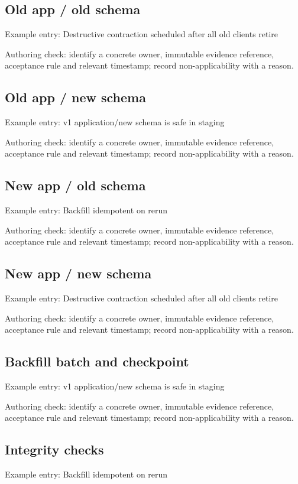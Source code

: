 \documentclass[10pt,letterpaper]{article}
\begin{document}
\subsection{Old app / old schema}
Example entry: Destructive contraction scheduled after all old clients retire

Authoring check: identify a concrete owner, immutable evidence reference, acceptance rule and relevant timestamp; record non-applicability with a reason.


\subsection{Old app / new schema}
Example entry: v1 application/new schema is safe in staging

Authoring check: identify a concrete owner, immutable evidence reference, acceptance rule and relevant timestamp; record non-applicability with a reason.


\subsection{New app / old schema}
Example entry: Backfill idempotent on rerun

Authoring check: identify a concrete owner, immutable evidence reference, acceptance rule and relevant timestamp; record non-applicability with a reason.


\subsection{New app / new schema}
Example entry: Destructive contraction scheduled after all old clients retire

Authoring check: identify a concrete owner, immutable evidence reference, acceptance rule and relevant timestamp; record non-applicability with a reason.


\subsection{Backfill batch and checkpoint}
Example entry: v1 application/new schema is safe in staging

Authoring check: identify a concrete owner, immutable evidence reference, acceptance rule and relevant timestamp; record non-applicability with a reason.


\subsection{Integrity checks}
Example entry: Backfill idempotent on rerun
\end{document}
